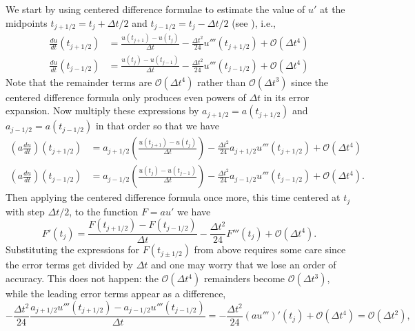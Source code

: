 We start by using centered 
difference formulae to estimate the value of 
$u'$ at the midpoints $t_{j+1/2} = t_j + \Delta t/2$ 
and $t_{j-1/2} = t_j - \Delta t/2$
(see ), i.e., 
\begin{equation*}
    \begin{aligned}
    \frac{d u}{dt}(t_{j+1/2})
    & = \frac{u(t_{j+1}) - u(t_j)}{\Delta t}
    - \frac{\Delta t^2}{24} u'''(t_{j+1/2})
    + \mathcal{O}(\Delta t^4) \\
    \frac{d u}{dt}(t_{j-1/2})
    & = \frac{u(t_{j}) - u(t_{j-1})}{\Delta t}
    - \frac{\Delta t^2}{24} u'''(t_{j-1/2})
    + \mathcal{O}(\Delta t^4)        
    \end{aligned}
\end{equation*}
Note that the remainder terms are $\mathcal{O}(\Delta t^4)$
rather than $\mathcal{O}(\Delta t^3)$ since the centered
difference formula only produces even powers of $\Delta t$
in its error expansion.
Now multiply these expressions by 
$ a_{j+1/2} = a(t_{j+1/2}) $ and 
$ a_{j-1/2}= a(t_{j-1/2})$ in that 
order  so that we have 
\begin{equation*}
\begin{aligned}
    \left( a \frac{d u}{dt} \right)(t_{j+1/2})
& = a_{j+1/2}
 \left( \frac{u(t_{j+1}) - u(t_j)}{\Delta t} \right)  
 - \frac{\Delta t^2}{24} a_{j+1/2}  u'''(t_{j+1/2}) 
+ \mathcal{O}(\Delta t^4)\\ 
   \left( a \frac{d u}{dt} \right)(t_{j-1/2}) 
& = a_{j-1/2}
 \left( \frac{u(t_{j}) - u(t_{j-1})}{\Delta t} \right)  
 - \frac{\Delta t^2}{24} a_{j-1/2}  u'''(t_{j-1/2}) 
  + 
 \mathcal{O}(\Delta t^4).
\end{aligned}
\end{equation*}
Then applying the centered difference formula once more,
this time centered at $t_j$ with step $\Delta t/2$, 
to the function $F = a u'$ we have
\begin{equation*}
    F'(t_j) = \frac{F(t_{j+1/2}) - F(t_{j-1/2})}{\Delta t}
    - \frac{\Delta t^2}{24} F'''(t_j) + \mathcal{O}(\Delta t^4).
\end{equation*}
Substituting the expressions for $F(t_{j\pm 1/2})$ from above
requires some care since the error terms
get divided by $\Delta t$ and one may worry that we lose
an order of accuracy. This does not happen: 
the $\mathcal{O}(\Delta t^4)$ remainders become $\mathcal{O}(\Delta t^3)$,
while the leading error terms appear as a difference, 
\begin{equation*}
    - \frac{\Delta t^2}{24} 
    \frac{a_{j+1/2} u'''(t_{j+1/2}) - a_{j-1/2} u'''(t_{j-1/2})}{\Delta t}
    = - \frac{\Delta t^2}{24} (a u''')'(t_j) + \mathcal{O}(\Delta t^4)
    = \mathcal{O}(\Delta t^2),
\end{equation*}
